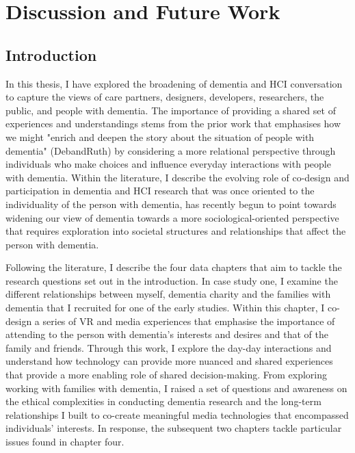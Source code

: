 

\chapter{Discussion and Future Work}
\label{Discussion}

\section{Introduction}
\label{Discussion:Intro}
In this thesis, I have explored the broadening of dementia and HCI conversation to capture the views of care partners, designers, developers, researchers, the public, and people with dementia. The importance of providing a shared set of experiences and understandings stems from the prior work that emphasises how we might "enrich and deepen the story about the situation of people with dementia" (DebandRuth) by considering a more relational perspective through individuals who make choices and influence everyday interactions with people with dementia. Within the literature, I describe the evolving role of co-design and participation in dementia and HCI research that was once oriented to the individuality of the person with dementia, has recently begun to point towards widening our view of dementia towards a more sociological-oriented perspective that requires exploration into societal structures and relationships that affect the person with dementia. 

Following the literature, I describe the four data chapters that aim to tackle the research questions set out in the introduction. In case study one, I examine the different relationships between myself, dementia charity and the families with dementia that I recruited for one of the early studies. Within this chapter, I co-design a series of VR and media experiences that emphasise the importance of attending to the person with dementia's interests and desires and that of the family and friends. Through this work, I explore the day-day interactions and understand how technology can provide more nuanced and shared experiences that provide a more enabling role of shared decision-making. From exploring working with families with dementia, I raised a set of questions and awareness on the ethical complexities in conducting dementia research and the long-term relationships I built to co-create meaningful media technologies that encompassed individuals' interests. In response, the subsequent two chapters tackle particular issues found in chapter four. 

